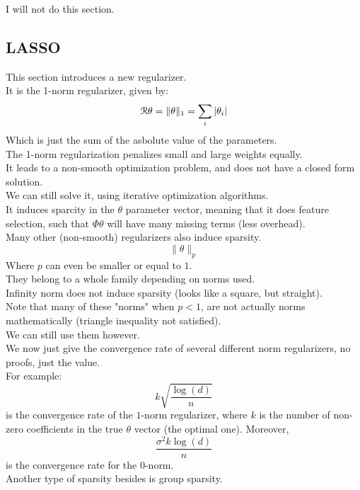 \documentclass[12pt]{article}
\begin{document}
I will not do this section. \\

\newpage

\subsection*{LASSO}

This section introduces a new regularizer. \\

It is the 1-norm regularizer, given by:
\[ \mathcal{R}{\theta} = \|\theta\|_1
= \sum_i |\theta_i| \]
Which is just the sum of the asbolute value
of the parameters. \\

The 1-norm regularization penalizes small and large
weights equally. \\
It leads to a non-smooth optimization problem,
and does not have a closed form solution. \\
We can still solve it, using iterative
optimization algorithms. \\

It induces sparcity in the $\theta$
parameter vector, meaning that it does
feature selection, such that $\Phi \theta$
will have many missing terms (less overhead). \\

Many other (non-smooth) regularizers also
induce sparsity. \\
\[ \|\theta\|_p \]
Where $p$ can even be smaller or equal to $1$. \\
They belong to a whole family
depending on norms used. \\

Infinity norm does not induce sparsity
(looks like a square, but straight). \\

Note that many of these "norms"
when $p < 1$, are not actually norms
mathematically (triangle inequality not satisfied). \\
We can still use them however. \\

We now just give the convergence rate of
several different norm regularizers,
no proofs, just the value. \\
For example:
\[ k \sqrt{\dfrac{\log(d)}{n}} \]
is the convergence rate of the $1$-norm
regularizer, where $k$ is the number of non-zero
coefficients in the true $\theta$ vector
(the optimal one). Moreover,
\[ \dfrac{\sigma^2 k \log(d)}{n} \]
is the convergence rate for the $0$-norm. \\

Another type of sparsity besides
is group sparsity. \\

\newpage
\end{document}

